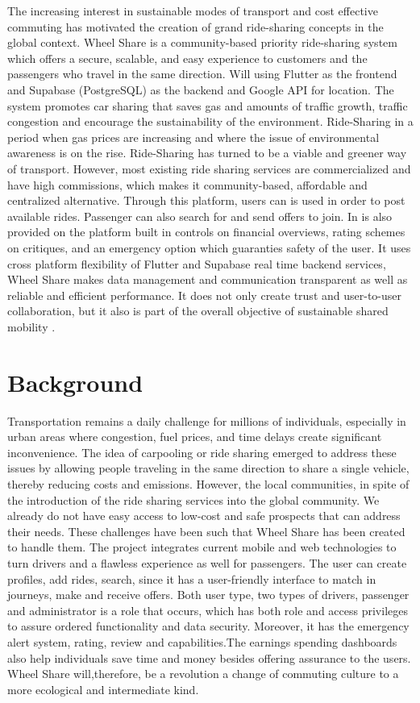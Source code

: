 The increasing interest in sustainable modes of transport and cost effective commuting has motivated the creation of grand ride-sharing concepts in the global context. Wheel Share is a community-based priority ride-sharing system which offers a secure, scalable, and easy experience to customers and the passengers who travel in the same direction. Will using Flutter as the frontend and Supabase (PostgreSQL) as the backend and Google API for location. The system promotes car sharing that saves gas and amounts of traffic growth, traffic congestion and encourage the sustainability of the environment. Ride-Sharing in a period when gas prices are increasing and where the issue of environmental awareness is on the rise.
Ride-Sharing has turned to be a viable and greener way of transport. However, most existing ride sharing services are commercialized and have high commissions, which makes it community-based, affordable and centralized alternative. Through this platform, users can is used in order to post available rides.
Passenger can also search for and send offers to join.
In is also provided on the platform built in controls on financial overviews, rating schemes on critiques, and an emergency option which guaranties safety of the user.
It uses cross platform flexibility of Flutter and Supabase real time backend services, Wheel Share makes data management and communication transparent as well as reliable and efficient performance. It does not only create trust and user-to-user collaboration, but it also
is part of the overall objective of sustainable shared mobility
\cite{mitropoulos2021}.


\section{Background}

Transportation remains a daily challenge for millions of individuals, especially in urban areas where congestion, fuel prices, and time delays create significant inconvenience. The idea of carpooling or ride sharing emerged to address these issues by allowing people traveling in the same direction to share a single vehicle, thereby reducing costs and emissions. However, the local communities, in spite of the introduction of the ride sharing services into the global community. We already do not have easy access to low-cost and safe prospects that can address their needs. These challenges have been such that Wheel Share has been created to handle them. The project integrates current mobile and web technologies to turn drivers and a flawless  experience as well for passengers. The user can create profiles, add rides, search, since it has a user-friendly interface to match in journeys, make and receive offers. Both user type, two types of drivers, passenger and administrator is a role that occurs, which has both role and access privileges to assure ordered functionality and data security.
Moreover, it has the emergency alert system, rating, review and capabilities.The earnings spending dashboards also help individuals save time and money besides offering assurance to the users. Wheel Share will,therefore, be a revolution a change of commuting culture to a more ecological and intermediate kind.


